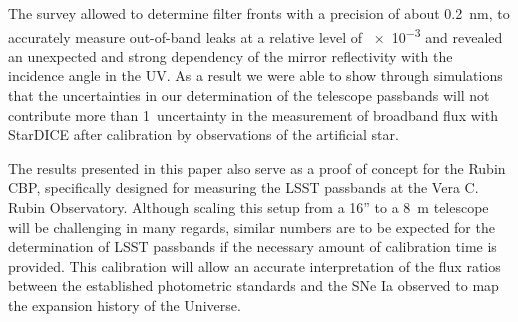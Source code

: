 The survey allowed to determine filter fronts with a precision of
about \SI{0.2}{\nano\meter}, to accurately measure out-of-band leaks at a relative
level of \num{e-3} and revealed an unexpected and strong dependency of
the mirror reflectivity with the incidence angle in the UV. As a
result we were able to show through simulations that the uncertainties in our determination of the
telescope passbands will not contribute more than 1\textperthousand\
uncertainty in the measurement of broadband flux with StarDICE after
calibration by observations of the artificial star. 

The results presented in this paper also serve as a proof of concept for the Rubin CBP, specifically designed for measuring the LSST passbands at the Vera C. Rubin Observatory. Although scaling this setup from a 16'' to a \SI{8}{\meter} telescope will be challenging in many regards, similar numbers are to be expected for the determination of LSST passbands if the necessary amount of calibration time is provided. This calibration will allow an accurate interpretation of the flux ratios between the established photometric standards and the SNe Ia observed to map the expansion history of the Universe.


